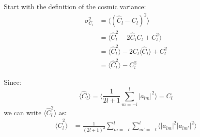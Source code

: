 \bigskip \noindent
\begin{foundation}
    Start with the definition of the cosmic variance:
    \begin{align*}
        \sigma_{C_l}^2 &= \langle (\hat{C}_l - C_l)^2 \rangle \\
        &= \langle \hat{C}_l^2 - 2 \hat{C}_l C_l + C_l^2 \rangle \\
        &= \langle \hat{C}_l^2 \rangle - 2 C_l \langle \hat{C}_l \rangle + C_l^2 \\
        &= \langle \hat{C}_l^2 \rangle - C_l^2
    \end{align*} 

    Since:
    \[
        \langle \hat{C}_l \rangle = \langle \frac{1}{2l + 1} \sum_{m=-l}^{l} |a_{lm}|^2 \rangle = C_l
    \]
    we can write $\langle \hat{C}_l^2 \rangle$ as:
    \begin{align*}
        \langle \hat{C}_l^2 \rangle &= \frac{1}{(2l + 1)^2} \sum_{m=-l}^{l} \sum_{m'=-l}^{l} \langle |a_{lm}|^2 |a_{lm'}|^2 \rangle \\
    \end{align*} \\


\end{foundation}
